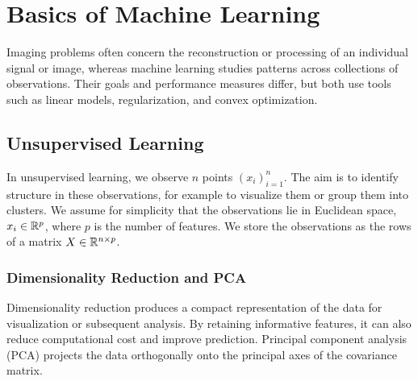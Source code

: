 
\chapter{Basics of Machine Learning}



Imaging problems often concern the reconstruction or processing of an individual signal or image, whereas machine learning studies patterns across collections of observations. Their goals and performance measures differ, but both use tools such as linear models, regularization, and convex optimization.


\section{Unsupervised Learning}

In unsupervised learning, we observe $n$ points $(x_i)_{i=1}^n$.
%
The aim is to identify structure in these observations, for example to visualize them or group them into clusters.
%
We assume for simplicity that the observations lie in Euclidean space, $x_i \in \mathbb{R}^p$, where $p$ is the number of features. We store the observations as the rows of a matrix $X\in\mathbb{R}^{n\times p}$.


\subsection{Dimensionality Reduction and PCA}

Dimensionality reduction produces a compact representation of the data for visualization or subsequent analysis. By retaining informative features, it can also reduce computational cost and improve prediction.
%
Principal component analysis (PCA) projects the data orthogonally onto the principal axes of the covariance matrix.

